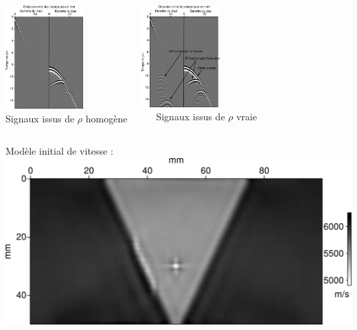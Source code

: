 \documentclass[10pt,xcolor=x11names,compress, notes=show]{beamer}%
\begin{document}
\begin{frame}{\insertsubsectionhead}
\begin{footnotesize}

		\centering
		\begin{columns}
			\raggedleft
			\includegraphics[width=3cm]{img/rho_mono/data_rho_uni.png}\\
			Signaux issus de $\rho$ homogène\hspace{-0.5cm}
			\raggedright
			\includegraphics[width=3cm]{img/rho_mono/data_rho_vrai.png}\\
			~~~Signaux issus de $\rho$ vraie
		\end{columns}		
		\vfill
		
		\begin{columns}
			\column{0.35\textwidth}	
			\centering
			Modèle initial de vitesse : \\[0.2cm]
			\includegraphics[width=\textwidth]{img/vp_mono_smooth/vp_smooth.png}\\
			

\end{columns}
\end{footnotesize}
\end{frame}
\end{document}
